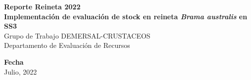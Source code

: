 

\begin{flushleft}
\Large{\textbf{Reporte Reineta 2022}}\\
\vspace*{2\baselineskip}
\LARGE{\textbf{Implementación de evaluación de stock en reineta \textit{Brama australis} en SS3}}\\
\vspace*{3\baselineskip}
\Large{Grupo de Trabajo DEMERSAL-CRUSTACEOS}\\
\vspace*{1\baselineskip}
\Large{Departamento de Evaluación de Recursos }\\
\vspace*{3\baselineskip}
\end{flushleft}
\begin{flushright}

\normalsize{\textbf{Fecha}}\\
Julio, 2022
\end{flushright}



\hypersetup{linkcolor = black}
\newpage
{}

\newpage



\hypersetup{linkcolor = blue}